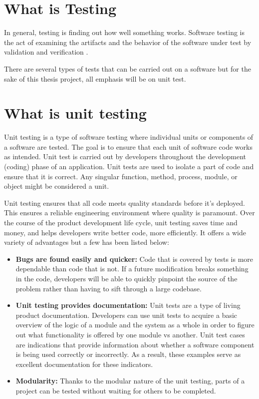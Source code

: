 \section{What is Testing}
In general, testing is finding out how well something works. Software testing is the act of examining the artifacts and the behavior of the software under test by validation and verification \cite{wikipedia-testing}.

There are several types of tests that can be carried out on a software but for the sake of this thesis project, all emphasis will be on unit test.

\section{What is unit testing}
Unit testing is a type of software testing where individual units or components of a software are tested. The goal is to ensure that each unit of software code works as intended. Unit test is carried out by developers throughout the development (coding) phase of an application. Unit tests are used to isolate a part of code and ensure that it is correct. Any singular function, method, process, module, or object might be considered a unit.

Unit testing ensures that all code meets quality standards before it’s deployed. This ensures a reliable engineering environment where quality is paramount. Over the course of the product development life cycle, unit testing saves time and money, and helps developers write better code, more efficiently. It offers a wide variety of advantages but a few has been listed below:

\begin{itemize}
  \item \textbf{Bugs are found easily and quicker:} Code that is covered by tests is more dependable than code that is not. If a future modification breaks something in the code, developers will be able to quickly pinpoint the source of the problem rather than having to sift through a large codebase.
  \item \textbf{Unit testing provides documentation:} Unit tests are a type of living product documentation. Developers can use unit tests to acquire a basic overview of the logic of a module and the system as a whole in order to figure out what functionality is offered by one module vs another. Unit test cases are indications that provide information about whether a software component is being used correctly or incorrectly. As a result, these examples serve as excellent documentation for these indicators.
  \item \textbf{Modularity:} Thanks to the modular nature of the unit testing, parts of a project can be tested without waiting for others to be completed.
\end{itemize}


